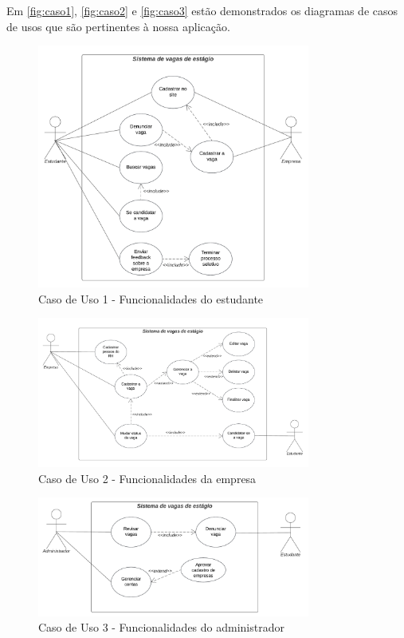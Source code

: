 Em \autoref{fig:caso1}, \autoref{fig:caso2} e \autoref{fig:caso3} estão demonstrados os diagramas de casos de usos que são pertinentes à nossa aplicação.

\begin{figure}[H]
	\centering 
	\caption{\label{fig:caso1}Caso de Uso 1 - Funcionalidades do estudante}
	\includegraphics[width=0.8\textwidth]{../imagens/caso-de-uso-1.png} 
\end{figure}

\begin{figure}[H]
	\centering 
	\caption{\label{fig:caso2}Caso de Uso 2 - Funcionalidades da empresa}
	\includegraphics[width=0.8\textwidth]{../imagens/caso-de-uso-2.png} 
\end{figure}

\begin{figure}[H]
	\centering 
	\caption{\label{fig:caso3}Caso de Uso 3 - Funcionalidades do administrador}
	\includegraphics[width=0.8\textwidth]{../imagens/caso-de-uso-3.png} 
\end{figure}

